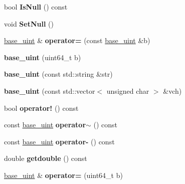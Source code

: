 \begin{DoxyCompactItemize}
bool {\bfseries Is\+Null} () const
\item 
\mbox{\label{classbase__uint_ab7f832a0d48a7da00296497c820ae775}} 
void {\bfseries Set\+Null} ()
\item 
\mbox{\label{classbase__uint_a0425a3c4d342b6fc9a68b1766cee9ede}} 
\mbox{\hyperlink{classbase__uint}{base\+\_\+uint}} \& {\bfseries operator=} (const \mbox{\hyperlink{classbase__uint}{base\+\_\+uint}} \&b)
\item 
\mbox{\label{classbase__uint_a217f9750f0ca9cdeefffb7bb1f1952d6}} 
{\bfseries base\+\_\+uint} (uint64\+\_\+t b)
\item 
\mbox{\label{classbase__uint_aa1ebaba47302da3e120879d186355736}} 
{\bfseries base\+\_\+uint} (const std\+::string \&str)
\item 
\mbox{\label{classbase__uint_ab6dd7d7921572078a4733e4acc22b2a9}} 
{\bfseries base\+\_\+uint} (const std\+::vector$<$ unsigned char $>$ \&vch)
\item 
\mbox{\label{classbase__uint_afbcdb1cf849d37272b4e7d4fabf1192b}} 
bool {\bfseries operator!} () const
\item 
\mbox{\label{classbase__uint_a2803d039b33d5570f47ac39d797bc9ea}} 
const \mbox{\hyperlink{classbase__uint}{base\+\_\+uint}} {\bfseries operator$\sim$} () const
\item 
\mbox{\label{classbase__uint_a3b758876b828c6faffdc2a2880122595}} 
const \mbox{\hyperlink{classbase__uint}{base\+\_\+uint}} {\bfseries operator-\/} () const
\item 
\mbox{\label{classbase__uint_ac989d44cd0d60e6c510722a714b817fa}} 
double {\bfseries getdouble} () const
\item 
\mbox{\label{classbase__uint_a115a5ddb2f2637e09703a25cfc580483}} 
\mbox{\hyperlink{classbase__uint}{base\+\_\+uint}} \& {\bfseries operator=} (uint64\+\_\+t b)
\item 
\mbox{\label{classbase__uint_ad5ec10977ebeab115fe857637990e267}} 

\end{DoxyCompactItemize}
